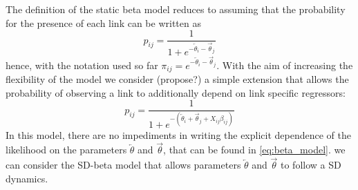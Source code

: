\documentclass[a4paper,12pt]{article}
\newcommand{\tonde}[1]{\left(#1\right)}
\newcommand{\Yt}{{\mathbf{Y}^{\tonde{t}}}}
\newcommand{\et}{^{\tonde{t}}}
\newcommand{\binpar}{\theta}
\newcommand{\ibinpar}{{\overleftarrow{\binpar}}}
\newcommand{\obinpar}{{\overrightarrow{\binpar}}}
\begin{document}
The definition of the static beta model reduces to assuming that the probability for the presence of each link can be written as
$$
 p_{ij}  = \frac{1}{1+ e^{ - \ibinpar_i - \obinpar_j }} 
$$
hence, with the notation used so far $\pi_{ij}  = e^{ - \ibinpar_i  - \obinpar_j }$.
With the aim of increasing the flexibility of the model we consider (propose?) a simple extension that allows the probability of observing a link to additionally depend on link specific regressors:
$$
p_{ij}  = \frac{1}{1+ e^{ - ( \ibinpar_i +  \obinpar_j + X_{ij} \beta_{ij} )}} 
$$
In this model, there are no impediments in writing the explicit dependence of the likelihood on the parameters $ \ibinpar $ and $ \obinpar$, that can be found in  \eqref{eq:beta_model}.  
we can consider the SD-beta model that allows parameters $\ibinpar$ and $\obinpar$ to follow a SD dynamics.
\end{document}
